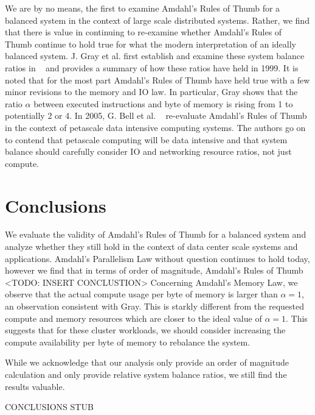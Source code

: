\documentclass{sig-alternate}
\begin{document}
We are by no means, the first to examine Amdahl's Rules of Thumb for a balanced system in the context of large scale distributed systems.
Rather, we find that there is value in continuing to re-examine whether Amdahl's Rules of Thumb continue to hold true for what the modern interpretation of an ideally balanced system.
J. Gray et al. first establish and examine these system balance ratios in ~\cite{export:68636} and provides a summary of how these ratios have held in 1999.
It is noted that for the most part Amdahl's Rules of Thumb have held true with a few minor revisions to the memory and IO law.
In particular, Gray shows that the ratio $\alpha$ between executed instructions and byte of memory is rising from 1 to potentially 2 or 4.
In 2005, G. Bell et al. ~\cite{Bell:2006:PCS:1110638.1110681} re-evaluate Amdahl's Rules of Thumb in the context of petascale data intensive computing systems.
The authors go on to contend that petascale computing will be data intensive and that system balance should carefully consider IO and networking resource ratios, not just compute.


\section{Conclusions}

We evaluate the validity of Amdahl's Rules of Thumb for a balanced system and analyze whether they still hold in the context of data center scale systems and applications.
Amdahl's Parallelism Law without question continues to hold today, however we find that in terms of order of magnitude, Amdahl's Rules of Thumb <TODO: INSERT CONCLUSTION>
Concerning Amdahl's Memory Law, we observe that the actual compute usage per byte of memory is larger than $\alpha=1$, an observation consistent with Gray.
This is starkly different from the requested compute and memory resources which are closer to the ideal value of $\alpha=1$.
This suggests that for these cluster workloads, we should consider increasing the compute availability per byte of memory to rebalance the system.

While we acknowledge that our analysis only provide an order of magnitude calculation and only provide relative system balance ratios, we still find the results valuable.


CONCLUSIONS STUB






\end{document}
